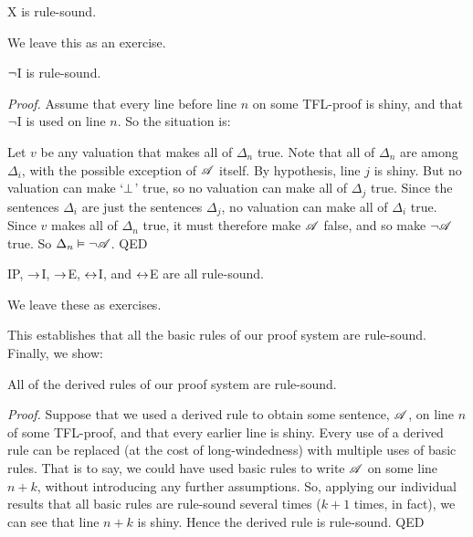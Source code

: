 \begin{factoidboxe}
	X is rule-sound.
\end{factoidboxe}

We leave this as an exercise.

\begin{factoidboxe}
	$\neg$I is rule-sound.
\end{factoidboxe}

\emph{Proof.}
	Assume that every line before line $n$ on some TFL-proof is shiny, and that $\neg$I is used on line $n$. So the situation is:
\begin{fitchproof}
   \open
	   \AS
   \close
\end{fitchproof}\noindent
Let $v$ be any valuation that makes all of $\Delta_{n}$ true. Note that all of $\Delta_{n}$ are among $\Delta_i$, with the possible exception of $\mathscr{A}$ itself. By hypothesis, line $j$ is shiny. But no valuation can make `$\bot$' true, so no valuation can make all of $\Delta_{j}$ true. Since the sentences $\Delta_i$ are just the sentences $\Delta_{j}$, no valuation can make all of $\Delta_i$ true. Since $v$ makes all of $\Delta_{n}$ true, it must therefore make $\mathscr{A}$ false, and so make $\neg \mathscr{A}$ true. So $\Delta_n \vDash \neg \mathscr{A}$.
QED


\begin{factoidboxe}\label{lem:LastRuleSound} IP, $\rightarrow$I,  $\rightarrow$E, $\leftrightarrow$I, and $\leftrightarrow$E are all rule-sound.
\end{factoidboxe}

We leave these as exercises.

This establishes that all the basic rules of our proof system are rule-sound. Finally, we show:

\begin{factoidboxe}All of the derived rules of our proof system are rule-sound.
\end{factoidboxe}

\emph{Proof.}
	Suppose that we used a derived rule to obtain some sentence, $\mathscr{A}$, on line $n$ of some TFL-proof, and that every earlier line is shiny. Every use of a derived rule can be replaced (at the cost of long-windedness) with multiple uses of basic rules. That is to say, we could have used basic rules to write $\mathscr{A}$ on some line $n + k$, without introducing any further assumptions. So, applying our individual results that all basic rules are rule-sound several times ($k + 1$ times, in fact), we can see that line $n+k$ is shiny. Hence the derived rule is rule-sound.
QED
	

